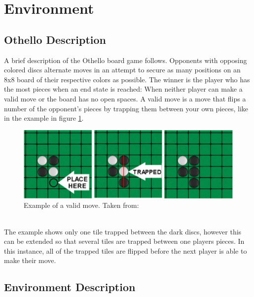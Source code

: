 \documentclass{article}
\begin{document}
\section{\label{doc:env}Environment}
\subsection{Othello Description}
A brief description of the Othello board game follows. Opponents with opposing colored discs alternate moves in an attempt to secure as many positions on an 8x8 board of their respective colors as possible. The winner is the player who has the most pieces when an end state is reached: When neither player can make a valid move or the board has no open spaces. A valid move is a move that flips a number of the opponent’s pieces by trapping them between your own pieces, like in the example in figure \ref{fig:valid_move}. 
\begin{figure}[ht] %
\centering
\includegraphics[width=0.75\linewidth]{figures/valid_move.png}
\caption{\label{fig:valid_move}Example of a valid move. Taken from: \cite{picture}}
\end{figure}
\\The example shows only one tile trapped between the dark discs, however this can be extended so that several tiles are trapped between one players pieces. In this instance, all of the trapped tiles are flipped before the next player is able to make their move.

\subsection{\label{doc:env_desc}Environment Description}
\end{document}
